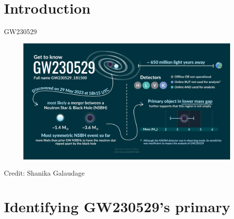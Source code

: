 \documentclass[usenames,dvipsnames,t]{beamer}
\begin{document}







\section{Introduction}

\begin{frame}{GW230529}

  \begin{figure}
    \centering
    \includegraphics[width=1\linewidth]{Figures/GetToKnowGW230529_English.png}
  \end{figure}

  \scriptsize Credit: Shanika Galaudage \normalsize
\end{frame}

\section{Identifying GW230529's primary}
\end{document}
